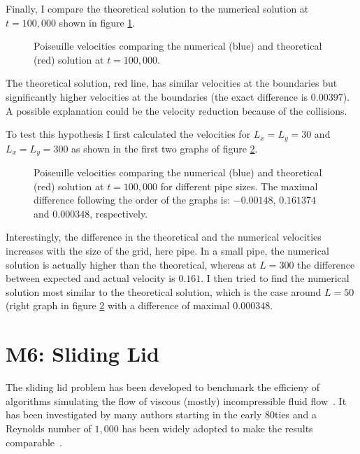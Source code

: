 \documentclass[a4paper,12pt, oneside]{book}
\begin{document}
Finally, I compare the theoretical solution to the numerical solution at $t=100,000$ shown in figure \ref{fig:m5-1-num-theo}.
\begin{figure}[ht]
\centering
\resizebox{0.7\columnwidth}{!}{\large}
\caption[Poiseuille numerical vs analytical]{Poiseuille velocities comparing the numerical (blue) and theoretical (red) solution at $t=100,000$.}
\label{fig:m5-1-num-theo}
\end{figure}
The theoretical solution, red line, has similar velocities at the boundaries but significantly higher velocities at the boundaries (the exact difference is $0.00397$).
A possible explanation could be the velocity reduction because of the collisions.

To test this hypothesis I first calculated the velocities for $L_x=L_y=30$ and $L_x=L_y=300$ as shown in the first two graphs of figure \ref{fig:m5-1-num-theo-extended}.
\begin{figure}[ht]
\centering
\resizebox{\columnwidth}{!}{\large}
\caption[Poiseuille analysis extended]{Poiseuille velocities comparing the numerical (blue) and theoretical (red) solution at $t=100,000$ for different pipe sizes. The maximal difference following the order of the graphs is: $-0.00148$, $0.161374$ and $0.000348$, respectively.}
\label{fig:m5-1-num-theo-extended}
\end{figure}
Interestingly, the difference in the theoretical and the numerical velocities increases with the size of the grid, here pipe. In a small pipe, the numerical solution is actually higher than the theoretical, whereas at $L=300$ the difference between expected and actual velocity is $0.161$. 
I then tried to find the numerical solution most similar to the theoretical solution, which is the case around $L=50$ (right graph in figure \ref{fig:m5-1-num-theo-extended} with a difference of maximal $0.000348$.


\section{M6: Sliding Lid}
The sliding lid problem has been developed to benchmark the efficieny of algorithms simulating the flow of viscous (mostly) incompressible fluid flow~\cite{bruneau20062-lid-cavity}.
It has been investigated by many authors starting in the early 80ties and a Reynolds number of $1,000$ has been widely adopted to make the results comparable~\cite{bruneau20062-lid-cavity}.
\end{document}
